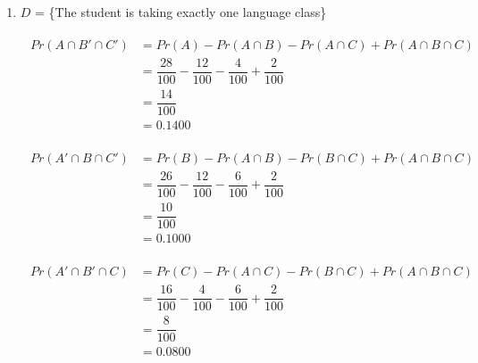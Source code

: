 \documentclass{article}
\begin{document}
\begin{enumerate}
\begin{enumerate}
			\newpage
			\item
			
			$D$ = \{The student is taking exactly one language class\}
			
			\begin{align*}
			\begin{split}
			Pr(A \cap B' \cap C') &= Pr(A) - Pr(A \cap B) - Pr(A \cap C) + Pr(A \cap B \cap C)\\ &= \dfrac{28}{100} - \dfrac{12}{100} - \dfrac{4}{100} + \dfrac{2}{100}\\ &= \dfrac{14}{100}\\ &= 0.1400
			\end{split}
			\end{align*}
			
			\begin{align*}
			\begin{split}
			Pr(A' \cap B \cap C') &= Pr(B) - Pr(A \cap B) - Pr(B \cap C) + Pr(A \cap B \cap C)\\ &= \dfrac{26}{100} - \dfrac{12}{100} - \dfrac{6}{100} + \dfrac{2}{100}\\ &= \dfrac{10}{100}\\ &= 0.1000
			\end{split}
			\end{align*}
			
			\begin{align*}
				\begin{split}
					Pr(A' \cap B' \cap C) &= Pr(C) - Pr(A \cap C) - Pr(B \cap C) + Pr(A \cap B \cap C)\\ &= \dfrac{16}{100} - \dfrac{4}{100} - \dfrac{6}{100} + \dfrac{2}{100}\\ &= \dfrac{8}{100}\\ &= 0.0800
				\end{split}
			\end{align*}
			

\end{enumerate}
\end{enumerate}
\end{document}

